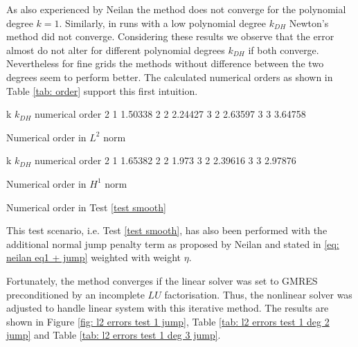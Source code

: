 As also experienced by Neilan \cite{Neilan2014} the method does not converge for the polynomial degree $k=1$. Similarly, in runs with a low polynomial degree $k_{DH}$ Newton's method did not converge.
Considering these results we observe that the error almost do not alter for different polynomial degrees $k_{DH}$ if both converge. Nevertheless for fine grids the methods without difference between the two degrees seem to perform better. The calculated numerical orders as shown in Table \ref{tab: order} support this first intuition.

\begin{table}[H]
\begin{subtable}[b]{0.45\textwidth}
\centering
	\pgfplotstabletypeset
	{
		k $k_{DH}$ {numerical order}
		2 1  1.50338
		2 2  2.24427
		3 2 2.63597
		3 3 3.64758
	}
	\caption{Numerical order in $L^2$ norm}
\end{subtable}
\begin{subtable}[b]{0.45\textwidth}
	\pgfplotstabletypeset
	{
		k $k_{DH}$ {numerical order}
		2 1  1.65382 
		2 2  1.973
		3 2 2.39616
		3 3 2.97876
	}
	\caption{Numerical order in $H^1$ norm}
	\end{subtable}
\caption{Numerical order in Test \ref{test smooth}}
\label{tab: order}
\end{table}

This test scenario, i.e. Test \ref{test smooth}, has also been performed with the additional normal jump penalty term as proposed by Neilan and stated in \eqref{eq: neilan eq1 + jump} weighted with weight $\eta$. 

Fortunately, the method converges if the linear solver was set to GMRES preconditioned by an incomplete $LU$ factorisation. Thus, the nonlinear solver was adjusted to handle linear system with this iterative method. The results are shown in Figure \ref{fig: l2 errors test 1 jump}, Table \ref{tab: l2 errors test 1 deg 2 jump} and Table \ref{tab: l2 errors test 1 deg 3 jump}. 

